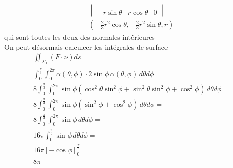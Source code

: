 \begin{myExample}
\begin{enumerate}
\begin{eqnarray*}
\begin{vmatrix}
					\\
					-r\sin\theta&r\cos\theta&0
				\end{vmatrix}=
				\\
				(-\frac{2}{3}r^2\cos\theta,-\frac{2}{3}r^2\sin\theta,r)
			\end{eqnarray*}
			qui sont toutes les deux des normales intérieures
			\\
			On peut désormais calculeer les intégrales de surface
			\begin{eqnarray*}
				\iint_{\Sigma_1}(F\cdot\nu)ds=
				\\
				\int_0^{\frac{\pi}{3}}\int_0^{2\pi}\alpha(\theta,\phi)\cdot2\sin\phi\,\alpha(\theta,\phi)\,d\theta d\phi=
				\\
				8\int_0^{\frac{\pi}{3}}\int_0^{2\pi}\sin\phi(\cos^2\theta\sin^2\phi+\sin^2\theta\sin^2\phi+\cos^2\phi)\,d\theta d\phi=
				\\
				8\int_0^{\frac{\pi}{3}}\int_0^{2\pi}\sin\phi(\sin^2\phi+\cos^2\phi)\,d\theta d\phi=
				\\
				8\int_0^{\frac{\pi}{3}}\int_0^{2\pi}\sin\phi\,d\theta d\phi=
				\\
				16\pi\int_0^{\frac{\pi}{3}}\sin\phi\,d\theta d\phi=
				\\
				16\pi\left[-\cos\phi\right]_0^{\frac{\pi}{3}}=
				\\
				8\pi				
			\end{eqnarray*}
	\end{enumerate}
\end{myExample}